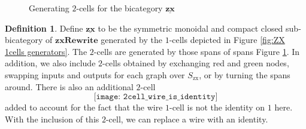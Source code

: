 \documentclass[11pt]{amsart}
\newcommand{\cat}[1]{\mathbf{#1}}
\theoremstyle{remark}
\theoremstyle{definition}
\newtheorem{defn}[thm]{Definition}
\newcommand{\zx}{_{\text{zx}}}
\newcommand{\bicat}[1]{\underline{\mathbf{#1}}}
\begin{document}
\begin{figure}[h]
	\caption{Generating $2$-cells for the bicategory $\bicat{zx}$}
	\label{fig:ZX 2cells generators}
\end{figure}

\begin{defn}
	\label{def:zx bicat}
	Define $\bicat{zx}$ to be the symmetric monoidal and compact closed sub-bicategory of $\cat{zxRewrite}$ generated by the $1$-cells depicted in Figure \ref{fig:ZX 1cells generators}.  The $2$-cells are generated by those spans of spans Figure \ref{fig:ZX 2cells generators}.  In addition, we also include $2$-cells obtained by exchanging red and green nodes, swapping inputs and outputs for each graph over $S\zx$, or by turning the spans around.  There is also an additional $2$-cell
	\[
		\texttt{[image: 2cell\_wire\_is\_identity]}
	\]
	added to account for the fact that the wire $1$-cell is not the identity on $1$ here. With the inclusion of this $2$-cell, we can replace a wire with an identity.
\end{defn}
\end{document}
